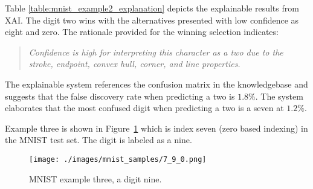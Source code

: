 Table \ref{table:mnist_example2_explanation} depicts the explainable results
from XAI. The digit two wins with the alternatives presented with low confidence
as eight and zero.  The rationale provided for the winning selection indicates:

\begin{quote}
    \textit{Confidence is high for interpreting this character as a two due to the stroke, endpoint, convex hull, corner, and line properties.}
\end{quote}

\begin{table}[H]
    \renewcommand{\arraystretch}{1.3}
     \label{table:mnist_example2_explanation}
    \begin{center}
    \end{center}
\end{table}

The explainable system references the confusion matrix in the knowledgebase and
suggests that the false discovery rate when predicting a two is $1.8\%$. The
system elaborates that the most confused digit when predicting a two is a seven
at $1.2\%$.

Example three is shown in Figure~\ref{fig:mnist_example3} which is index seven (zero
based indexing) in the MNIST test set. The digit is labeled as a nine.

\begin{figure}[H]
    \centerline{\texttt{[image: ./images/mnist\_samples/7\_9\_0.png]}}
    \caption{MNIST example three, a digit nine.}
    \label{fig:mnist_example3}
\end{figure}

